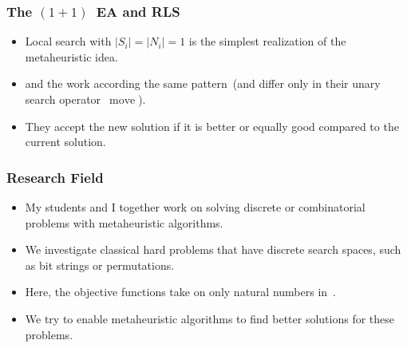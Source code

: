 \documentclass[aspectratio=169,mathserif,notheorems]{beamer}%
\begin{document}
%
\begin{frame}[t]%
\frametitle{The $(1+1)$~EA and RLS}%
\begin{itemize}%
\item Local search with $|S_i|=|N_i|=1$ is the simplest realization of the metaheuristic idea.%
\item<2->  and the  work according the same pattern~(and differ only in their unary search operator~$\mathop{move}$)\cite{DJW2002OTAOTOPOEA,CPD2018TAMPARAOEA}.%
\item<8-> They accept the new solution if it is better or equally good compared to the current solution.%
\end{itemize}%
%
%
%
%
%
%
%
%
%
%
%
%
%
%
%
%
%
%
%
%
%
%
\end{frame}%
%
\begin{frame}%
\frametitle{Research Field}%
\begin{itemize}%
%
\item My students and I together work on solving discrete or combinatorial problems with metaheuristic algorithms.%
%
\item<2-> We investigate classical hard problems that have discrete search spaces, such as bit strings or permutations.%
%
\item<3-> Here, the objective functions take on only natural numbers in~\naturalNumbersZ.%
%
\item<4-> We try to enable metaheuristic algorithms to find better solutions for these problems.%
%
\end{itemize}%
\end{frame}%
%
%
\end{document}
